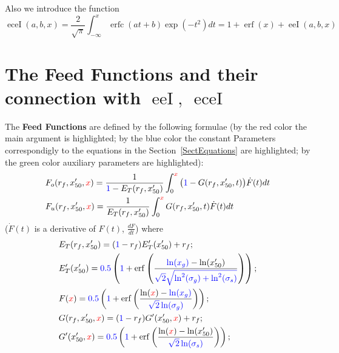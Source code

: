 \documentclass[12pt,reqno,intlimits,twoside]{amsart}
\DeclareMathOperator{\erf}{erf}%
\DeclareMathOperator{\erfc}{erfc}%
\DeclareMathOperator{\eeI}{eeI}%
\DeclareMathOperator{\eceI}{eceI}%
\begin{document}
Also we introduce the function
\begin{equation}\label{EqErfcExpInt}
   \eceI(a, b, x) =
   \frac{2}{\sqrt{\pi}}
   \int_{-\infty}^{x}\!\erfc(at + b)\exp(-t^2)dt =
   1 + \erf(x) + \eeI(a,b,x)
\end{equation}

\section{The Feed Functions and their connection with $\eeI,\ \eceI$}

The \textbf{Feed Functions} are defined by the following formulae
(by the red color the main argument is highlighted; by the blue color the constant Parameters
correspondigly to the equations in the Section~\ref{SectEquations} are highlighted;
by the green color auxiliary parameters are highlighted):
\begin{align*}
   & F_o(r_f, x'_{50}, \textcolor{red}{x}) =
     \dfrac{1}{\textcolor{blue}{1} - E_T(r_f, x'_{50})}
     \int_{0}^{\textcolor{red}{x}}\big(\textcolor{blue}{1} - G(r_f, x'_{50}, t)\big)\dot{F}(t)dt\\
   & F_u(r_f, x'_{50}, \textcolor{red}{x}) =
     \dfrac{1}{E_T(r_f, x'_{50})}
     \int_{0}^{\textcolor{red}{x}}G(r_f, x'_{50}, t)\dot{F}(t)dt
\end{align*}
($\dot{F}(t)$ is a derivative of $F(t)$, $\frac{dF}{dt}$) where
\begin{align*}
   & E_T(r_f, x'_{50}) = (\textcolor{blue}{1} - r_f)E'_T(x'_{50}) + r_f;\\
   & E'_T(x'_{50}) = \textcolor{blue}{0.5}
                     \left(\textcolor{blue}{1} +
                           \erf\left(\dfrac{\textcolor{blue}{\ln(x_g)} - \ln(x'_{50})}
                                           {\textcolor{blue}{\sqrt{2}\sqrt{\ln^2(\sigma_g) + \ln^2(\sigma_s)}}}
                                \right)
                     \right);\\
   & F(\textcolor{red}{x}) =
     \textcolor{blue}{0.5}
     \left(\textcolor{blue}{1} +
           \erf\left(\dfrac{\ln(\textcolor{red}{x}) - \textcolor{blue}{\ln(x_g)}}
                           {\textcolor{blue}{\sqrt{2}\ln(\sigma_g)}}
               \right)
     \right);\\
   & G(r_f, x'_{50}, \textcolor{red}{x}) =
     (\textcolor{blue}{1} - r_f)G'(x'_{50}, \textcolor{red}{x}) + r_f;\\
   & G'(x'_{50}, \textcolor{red}{x}) =
     \textcolor{blue}{0.5}
     \left(\textcolor{blue}{1} +
           \erf\left(\dfrac{\ln(\textcolor{red}{x}) - \ln(x'_{50})}
                           {\textcolor{blue}{\sqrt{2}\ln(\sigma_s)}}
               \right)
     \right);
\end{align*}
\end{document}
